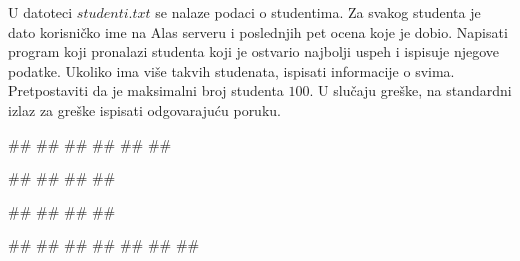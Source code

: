 \begin{Exercise}[label=p3_06] 
 U datoteci $studenti.txt$ se nalaze podaci o studentima.
 Za svakog studenta je dato korisničko ime na Alas serveru i poslednjih pet ocena koje je dobio. 
 Napisati program koji pronalazi studenta koji je ostvario najbolji 
 uspeh i ispisuje njegove podatke. Ukoliko ima više takvih studenata, ispisati informacije o svima.
 Pretpostaviti da je maksimalni broj studenta $100$.
 U slučaju greške, na standardni izlaz za greške ispisati odgovarajuću poruku.

\begin{miditest}
\begin{upotreba}{1}
##
##
##
##
##
##

#\naslovIzlaz#
##
##
##
\end{upotreba}
\end{miditest}
\begin{miditest}
\begin{upotreba}{2}
##
##
##
##

#\naslovIzlaz#
##
##
##
#\izlaz{}#
##
##
\end{upotreba}
\end{miditest}
\end{Exercise}
\begin{Answer}[ref=p3_06]
\end{Answer}


